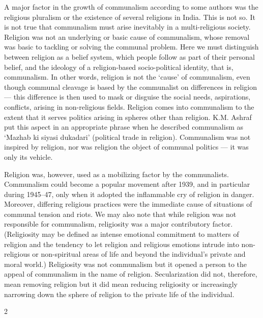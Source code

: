 \begin{multicols}{2}
A major factor in the growth of communalism according to some authors was the religious pluralism or the existence of several religions in India. This is not so. It is not true that communalism must arise inevitably in a multi-religious society. Religion was not an underlying or basic cause of communalism, whose removal was basic to tackling or solving the communal problem. Here we must distinguish between religion as a belief system, which people follow as part of their personal belief, and the ideology of a religion-based socio-political identity, that is, communalism. In other words, religion is not the `cause' of communalism, even though communal cleavage is based by the communalist on differences in religion --- this difference is then used to mask or disguise the social needs, aspirations, conflicts, arising in non-religious fields. Religion comes into communalism to the extent that it serves politics arising in spheres other than religion. K.M. Ashraf put this aspect in an appropriate phrase when he described communalism as `Mazhab ki siyasi dukadari' (political trade in religion). Communalism was not inspired by religion, nor was religion the object of communal politics --- it was only its vehicle. 

Religion was, however, used as a mobilizing factor by the communalists. Communalism could become a popular movement after 1939, and in particular during 1945--47, only when it adopted the inflammable cry of religion in danger. Moreover, differing religious practices were the immediate cause of situations of communal tension and riots. We may also note that while religion was not responsible for communalism, religiosity was a major contributory factor. (Religiosity may be defined as intense emotional commitment to matters of religion and the tendency to let religion and religious emotions intrude into non-religious or non-spiritual areas of life and beyond the individual's private and moral world.) Religiosity was not communalism but it opened a person to the appeal of communalism in the name of religion. Secularization did not, therefore, mean removing religion but it did mean reducing religiosity or increasingly narrowing down the sphere of religion to the private life of the individual.
\end{multicols}{2}
